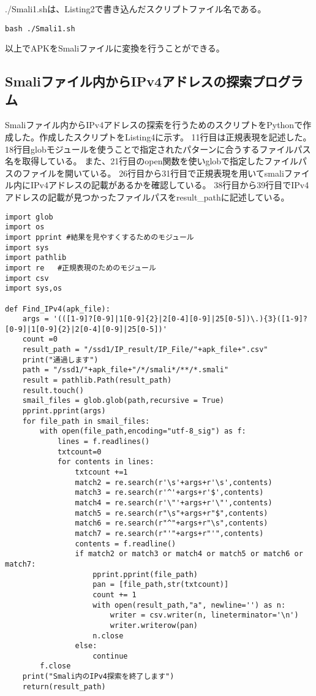 \documentclass[a4j]{jarticle}
\begin{document}
./Smali1.shは、Listing2で書き込んだスクリプトファイル名である。
\begin{lstlisting}[caption=シェルスクリプトの実行方法]
bash ./Smali1.sh　
\end{lstlisting}
以上でAPKをSmaliファイルに変換を行うことができる。

\subsection{Smaliファイル内からIPv4アドレスの探索プログラム}
Smaliファイル内からIPv4アドレスの探索を行うためのスクリプトをPythonで作成した。作成したスクリプトをListing4に示す。
11行目は正規表現を記述した。
18行目globモジュールを使うことで指定されたパターンに合うするファイルパス名を取得している。
また、21行目のopen関数を使いglobで指定したファイルパスのファイルを開いている。
26行目から31行目で正規表現を用いてsmaliファイル内にIPv4アドレスの記載があるかを確認している。
38行目から39行目でIPv4アドレスの記載が見つかったファイルパスをresult\_pathに記述している。
\begin{lstlisting}[caption=Smaliファイル内からIPv4アドレスの探索を行うためのPythonスクリプト]
import glob
import os
import pprint #結果を見やすくするためのモジュール
import sys
import pathlib
import re   #正規表現のためのモジュール
import csv
import sys,os

def Find_IPv4(apk_file):
	args = '(([1-9]?[0-9]|1[0-9]{2}|2[0-4][0-9]|25[0-5])\.){3}([1-9]?[0-9]|1[0-9]{2}|2[0-4][0-9]|25[0-5])'
	count =0
	result_path = "/ssd1/IP_result/IP_File/"+apk_file+".csv"
	print("通過します")
	path = "/ssd1/"+apk_file+"/*/smali*/**/*.smali"
	result = pathlib.Path(result_path)
	result.touch()
	smail_files = glob.glob(path,recursive = True)
	pprint.pprint(args)
	for file_path in smail_files:
		with open(file_path,encoding="utf-8_sig") as f:
			lines = f.readlines()
			txtcount=0
			for contents in lines:
				txtcount +=1
				match2 = re.search(r'\s'+args+r'\s',contents)
				match3 = re.search(r'^'+args+r'$',contents)
				match4 = re.search(r'\"'+args+r'\"',contents)
				match5 = re.search(r"\s"+args+r"$",contents)
				match6 = re.search(r"^"+args+r"\s",contents)
				match7 = re.search(r"'"+args+r"'",contents)
				contents = f.readline()
				if match2 or match3 or match4 or match5 or match6 or match7:
					pprint.pprint(file_path)
					pan = [file_path,str(txtcount)]
					count += 1
					with open(result_path,"a", newline='') as n:
						writer = csv.writer(n, lineterminator='\n')
						writer.writerow(pan)
					n.close
				else:
					continue
		f.close
	print("Smali内のIPv4探索を終了します")
	return(result_path)
		
\end{lstlisting}
\end{document}
